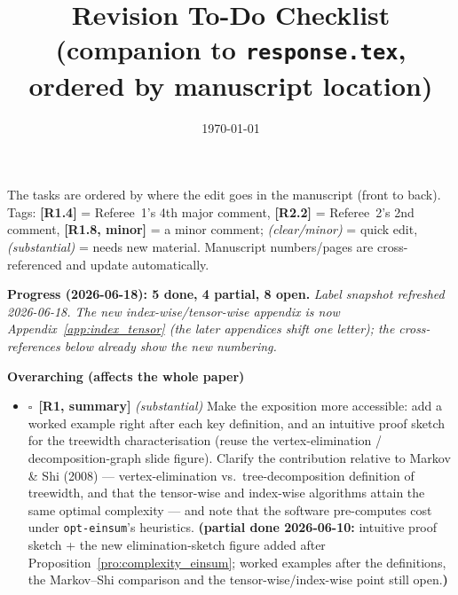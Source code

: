\documentclass[11pt]{article}
\title{Revision To-Do Checklist\\[-0.2em]
\large (companion to \texttt{response.tex}, ordered by manuscript location)}
\date{\today}
\author{}
\newcommand{\bx}{$\square$\ }   %
\begin{document}
\maketitle
\vspace{-2.5em}

\noindent
The tasks are ordered by where the edit goes in the manuscript (front to back).
Tags: \textbf{[R1.4]} = Referee~1's 4th major comment, \textbf{[R2.2]} = Referee~2's
2nd comment, \textbf{[R1.8, minor]} = a minor comment; \emph{(clear/minor)} = quick
edit, \emph{(substantial)} = needs new material. Manuscript numbers/pages are
cross-referenced and update automatically.

\medskip

\noindent\textbf{Progress (2026-06-18): 5 done, 4 partial, 8 open.}
\emph{Label snapshot refreshed 2026-06-18. The new index-wise/tensor-wise
appendix is now Appendix~\ref{app:index_tensor} (the later appendices shift one
letter); the cross-references below already show the new numbering.}

\bigskip

\noindent\textbf{\large Overarching (affects the whole paper)}
\begin{itemize}[leftmargin=1.4em, itemsep=0.45em]
\item \bx \textbf{[R1, summary]} \emph{(substantial)} Make the exposition more
accessible: add a worked example right after each key definition, and an intuitive
proof sketch for the treewidth characterisation (reuse the vertex-elimination /
decomposition-graph slide figure). Clarify the contribution relative to Markov \&
Shi (2008) --- vertex-elimination vs.\ tree-decomposition definition of treewidth,
and that the tensor-wise and index-wise algorithms attain the same optimal
complexity --- and note that the software pre-computes cost under
\texttt{opt-einsum}'s heuristics.
\textbf{(partial done 2026-06-10:} intuitive proof sketch + the new
elimination-sketch figure added after Proposition~\ref{pro:complexity_einsum};
worked examples after the definitions, the Markov--Shi comparison and the
tensor-wise/index-wise point still open.\textbf{)}
\end{itemize}

\medskip
\end{document}
